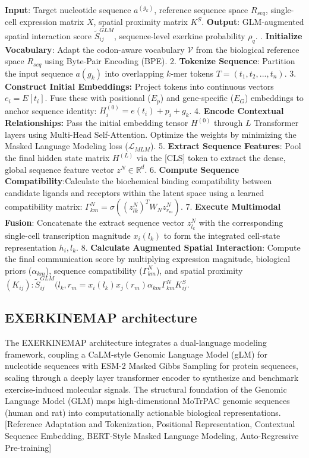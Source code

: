 \documentclass[11pt]{article}
\begin{document}
 \newline
\textbf{Input}: Target nucleotide sequence $a^{(g_k)}$, reference sequence space $R_{seq}$, single-cell expression matrix $X$, spatial proximity matrix $K^S$. \newline
\textbf{Output}: GLM-augmented spatial interaction score $\widetilde{S}_{ij}^{GLM}$, sequence-level exerkine probability $\rho_q$. . \textbf{Initialize Vocabulary}: Adapt the codon-aware vocabulary $\mathcal{V}$ from the biological reference space $R_{seq}$ using Byte-Pair Encoding (BPE).
2. \textbf{Tokenize Sequence}: Partition the input sequence $a(g_k)$ into overlapping $k$-mer tokens $T = (t_1,t_2,...,t_n)$.
3. \textbf{Construct Initial Embeddings:} Project tokens into continuous vectors $e_i = E[t_i]$. Fuse these with positional ($E_p$) and gene-specific ($E_G$) embeddings to anchor sequence identity: $H_i^{(0)} = e(t_i)+p_i+g_k$.
4. \textbf{Encode Contextual Relationships:} Pass the initial embedding tensor $H^{(0)}$ through $L$ Transformer layers using Multi-Head Self-Attention. Optimize the weights by minimizing the Masked Language Modeling loss ($\mathcal{L}_{MLM}$).
5. \textbf{Extract Sequence Features}: Pool the final hidden state matrix $H^{(L)}$ via the [CLS] token to extract the dense, global sequence feature vector $z^N \in \mathbb{R}^d$.
6. \textbf{Compute Sequence Compatibility}:Calculate the biochemical binding compatibility between candidate ligands and receptors within the latent space using a learned compatibility matrix: $\Gamma_{km}^N = \sigma((z_{lk}^N)^T W_N z_{r_m}^N)$.
7. \textbf{Execute Multimodal Fusion}: Concatenate the extract sequence vector $z_{l_k}^N$ with the corresponding single-cell transcription magnitude $x_i(l_k)$ to form the integrated cell-state representation $h_i,l_k$.
8. \textbf{Calculate Augmented Spatial Interaction}: Compute the final communication score by multiplying expression magnitude, biological priors ($\alpha_{km}$), sequence compatibility ($\Gamma_{km}^N$), and spatial proximity $(K_{ij}):\widetilde{S}_{ij}^{GLM}(l_k,r_m = x_i(l_k)x_j(r_m)\alpha_{km}\Gamma_{km}^NK_{ij}^S$.

\subsection{EXERKINEMAP architecture}
The EXERKINEMAP architecture integrates a dual-language modeling framework, coupling a CaLM-style Genomic Language Model (gLM) for nucleotide sequences with ESM-2 Masked Gibbs Sampling for protein sequences, scaling through a deeply layer transformer encoder to synthesize and benchmark exercise-induced molecular signals. The structural foundation of the Genomic Language Model (GLM) maps high-dimensional MoTrPAC genomic sequences (human and rat) into computationally actionable biological representations. 
[Reference Adaptation and Tokenization, Positional Representation, Contextual Sequence Embedding, BERT-Style Masked Language Modeling, Auto-Regressive Pre-training]
\end{document}
